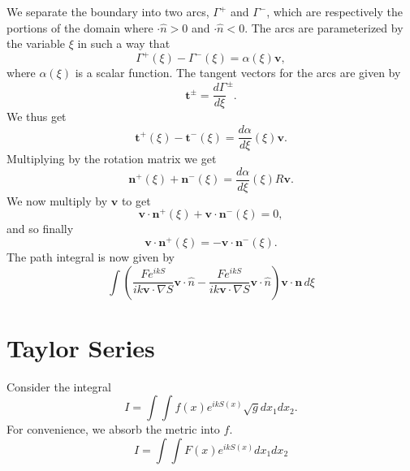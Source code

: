 \documentclass{article}
\theoremstyle{plain}
\begin{document}
We separate the boundary into two arcs, $\Gamma^+$ and $\Gamma^-$,
which are respectively the portions of the domain where $\mathbf\cdot\hat{n} > 0$ and $\mathbf\cdot\hat{n} < 0$.
The arcs are parameterized by the variable $\xi$ in such a way that
\begin{equation}
	\Gamma^+(\xi) - \Gamma^-(\xi) = \alpha(\xi)\mathbf{v},
\end{equation}
where $\alpha(\xi)$ is a scalar function.
The tangent vectors for the arcs are given by
\begin{equation}
	\mathbf{t}^\pm = \frac{d\Gamma}{d\xi}^\pm.
\end{equation}
We thus get
\begin{equation}
	\mathbf{t}^+(\xi) - \mathbf{t}^-(\xi) = \frac{d\alpha}{d\xi}(\xi)\mathbf{v}.
\end{equation}
Multiplying by the rotation matrix we get
\begin{equation}
	\mathbf{n}^+(\xi) + \mathbf{n}^-(\xi) = \frac{d\alpha}{d\xi}(\xi)R\mathbf{v}.
\end{equation}
We now multiply by $\mathbf{v}$ to get
\begin{equation}
	\mathbf{v}\cdot\mathbf{n}^+(\xi) + \mathbf{v}\cdot\mathbf{n}^-(\xi) = 0,
\end{equation}
and so finally
\begin{equation}
	\mathbf{v}\cdot\mathbf{n}^+(\xi) = -\mathbf{v}\cdot\mathbf{n}^-(\xi).
\end{equation}
The path integral is now given by
\begin{equation}
	 \int \left( \frac{Fe^{ikS}}{ik\mathbf{v}\cdot\nabla S} \mathbf{v}\cdot\hat{n}
	 - \frac{Fe^{ikS}}{ik\mathbf{v}\cdot\nabla S} \mathbf{v}\cdot\hat{n} \right)\mathbf{v}\cdot\mathbf{n} \,d\xi
\end{equation}



\section{Taylor Series}


Consider the integral
\begin{equation}
	I = \int\int f(x) e^{ikS(x)} \sqrt{g} dx_1dx_2.
\end{equation}
For convenience, we absorb the metric into $f$.
\begin{equation}
	I = \int\int F(x) e^{ikS(x)} dx_1dx_2
\end{equation}
\end{document}
